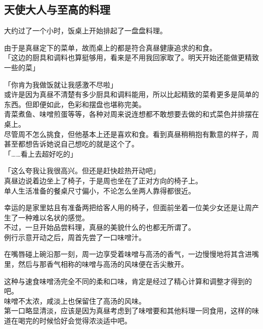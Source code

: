 \subsection{天使大人与至高的料理}

大约过了一个小时，饭桌上开始排起了一盘盘料理。

由于是真昼定下的菜单，故而桌上的都是符合真昼健康追求的和食。\\

「这边的厨具和调料也算挺够用，看来是不用我回家取了。明天开始还能做更精致一些的菜」

「你肯为我做饭就让我感激不尽啦」\\

或许是因为真昼不清楚有多少厨具和调料能用，所以比起精致的菜肴更多是简单的东西。但即便如此，色彩和摆盘也堪称完美。\\

青菜煮鱼、味噌煎蛋等等，各种对周来说连想都不敢想要去做的和式菜色并排摆在桌上。\\

尽管周不怎么挑食，但他基本上还是喜欢和食。看到真昼稍稍抱有歉意的样子，周甚至都想告诉她说自己想吃的就是这个了。\\

「……看上去超好吃的」

「这么夸我让我很高兴。但还是赶快趁热开动吧」\\

真昼边说着边坐上了椅子，于是周也坐在了正对方向的椅子上。\\

单人生活准备的餐桌尺寸偏小，不论怎么坐两人靠得都很近。

幸运的是家里姑且有准备两把给客人用的椅子，但面前坐着一位美少女还是让周产生了一种难以名状的感觉。\\

不过，一旦开始品尝料理，真昼的美貌什么的也都无所谓了。\\

例行示意开动之后，周首先尝了一口味噌汁。

在嘴唇碰上碗沿那一刻，周一边享受着味噌与高汤的香气，一边慢慢地将其含进嘴里，然后与那香气相称的味噌与高汤的风味便在舌尖散开。

这种与速食味噌汤完全不同的柔和口味，肯定是经过了精心计算和调整才得到的吧。\\

味噌不太浓，咸淡上也保留住了高汤的风味。\\

第一口略显清淡，应该是因为真昼考虑到了味噌要和其他料理一同食用，这样的味道在喝完的时候恰好会觉得浓淡适中吧。\\

